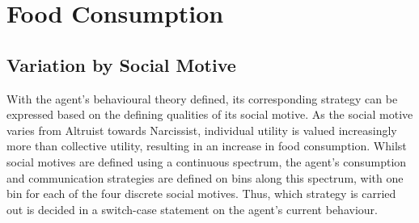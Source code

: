 




\section{Food Consumption}\label{food_consumption}

\subsection{Variation by Social Motive}
With the agent's behavioural theory defined, its corresponding strategy can be expressed based on the defining qualities of its social motive. As the social motive varies from Altruist towards Narcissist, individual utility is valued increasingly more than collective utility, resulting in an increase in food consumption. Whilst social motives are defined using a continuous spectrum, the agent’s consumption and communication strategies are defined on bins along this spectrum, with one bin for each of the four discrete social motives. Thus, which strategy is carried out is decided in a switch-case statement on the agent's current behaviour.




